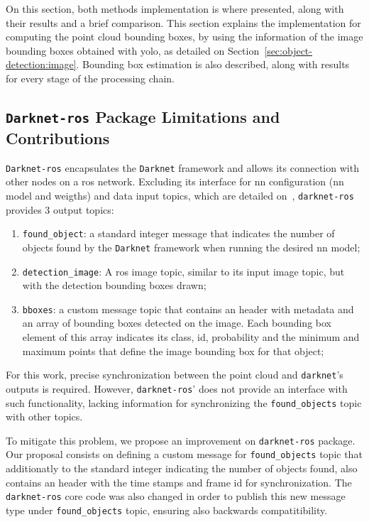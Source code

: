 On this section, both methods implementation is where presented, along with their results and a brief comparison. This section explains the implementation for computing the point cloud bounding boxes, by using the information of the image bounding boxes obtained with \ac{yolo}, as detailed on Section~\ref{sec:object-detection:image}. Bounding box estimation is also described, along with results for every stage of the processing chain.


\subsection{\texttt{Darknet-ros} Package Limitations and Contributions}
\texttt{Darknet-ros} encapsulates the \texttt{Darknet} framework and allows its connection with other nodes on a \ac{ros} network. Excluding its interface for \ac{nn} configuration (\ac{nn} model and weigths) and data input topics, which are detailed on~\cite{MarkoBjelonic}, \texttt{darknet-ros} provides 3 output topics:

\begin{enumerate}
	\item \texttt{found\_object}: a standard integer message that indicates the number of objects found by the \texttt{Darknet} framework when running the desired \ac{nn} model;
	\item \texttt{detection\_image}: A \ac{ros} image topic, similar to its input image topic, but with the detection bounding boxes drawn;
	\item \texttt{bboxes}: a custom message topic that contains an header with metadata and an array of bounding boxes detected on the image. Each bounding box element of this array indicates its class, id, probability and the minimum and maximum points that define the image bounding box for that object;
\end{enumerate}

For this work, precise synchronization between the point cloud and \texttt{darknet}'s outputs is required. However, \texttt{darknet-ros}' does not provide an interface with such functionality, lacking information for synchronizing the \texttt{found\_objects} topic with other topics.

To mitigate this problem, we propose an improvement on \texttt{darknet-ros} package. Our proposal consists on defining a custom message for \texttt{found\_objects} topic that additionatly to the standard integer indicating the number of objects found, also contains an header with the time stamps and frame id for synchronization. The \texttt{darknet-ros} core code was also changed in order to publish this new message type under \texttt{found\_objects} topic, ensuring also backwards compatitibility.

